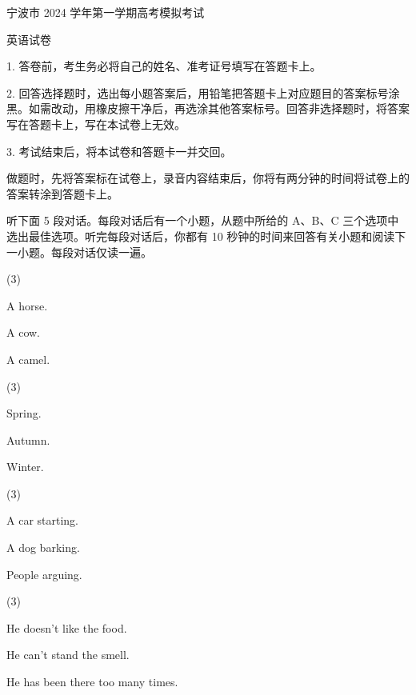 \documentclass{英语试卷}
\begin{document}
\par 宁波市 2024 学年第一学期高考模拟考试\par
\par 英语试卷\par
\begin{notice}
\par 1. 答卷前，考生务必将自己的姓名、准考证号填写在答题卡上。\par
\par 2. 回答选择题时，选出每小题答案后，用铅笔把答题卡上对应题目的答案标号涂黑。如需改动，用橡皮擦干净后，再选涂其他答案标号。回答非选择题时，将答案写在答题卡上，写在本试卷上无效。\par
\par 3. 考试结束后，将本试卷和答题卡一并交回。\par
\end{notice}
\par 做题时，先将答案标在试卷上，录音内容结束后，你将有两分钟的时间将试卷上的答案转涂到答题卡上。\par
{}
\par 听下面 5 段对话。每段对话后有一个小题，从题中所给的 A、B、C 三个选项中选出最佳选项。听完每段对话后，你都有 10 秒钟的时间来回答有关小题和阅读下一小题。每段对话仅读一遍。\par
{}
\begin{choices}(3)
  \item A horse.
  \item A cow.
  \item A camel.
\end{choices}
\begin{choices}(3)
  \item Spring.
  \item Autumn.
  \item Winter.
\end{choices}
\begin{choices}(3)
  \item A car starting.
  \item A dog barking.
  \item People arguing.
\end{choices}
\begin{choices}(3)
  \item He doesn't like the food.
  \item He can't stand the smell.
  \item He has been there too many times.
\end{choices}
\end{document}

